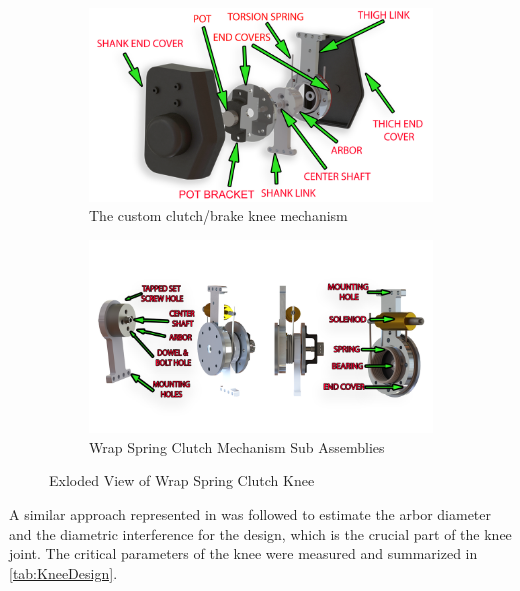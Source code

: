 \begin{figure}
    \begin{subfigure}{\textwidth}
        \centering
        \captionsetup{justification=centering}
        \centerline{
        \includegraphics[scale=0.16]{images/mech_design/knee exploded view_edit2.png}}
        \caption[Custom Knee Mechanism]{The custom clutch/brake knee mechanism}
        \label{fig:kneemechASM}
    \end{subfigure}
    \begin{subfigure}{\textwidth}
        \centering
        \captionsetup{justification=centering}
        \centerline{
        \includegraphics[scale=0.3]{images/mech_design/all_knee.png}}
        \caption[Wrap Spring Clutch Mechanism]{Wrap Spring Clutch Mechanism Sub Assemblies}
        \label{fig:subknee}
    \end{subfigure}    
    \caption{Exloded View of Wrap Spring Clutch Knee}
    \label{fig:kneemech}
\end{figure}

A similar approach represented in \cite{tung2013design} was followed to estimate the arbor diameter and the diametric interference for the design, which is the crucial part of the knee joint. The critical parameters of the knee were measured and summarized in \autoref{tab:KneeDesign}.


